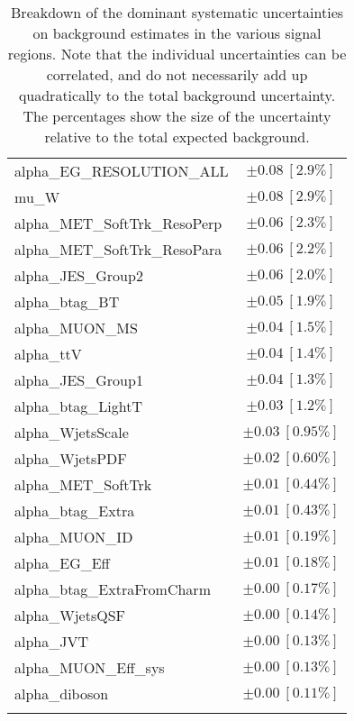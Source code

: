 \begin{table}
\begin{center}
\begin{tabular*}{\textwidth}{@{\extracolsep{\fill}}lc}
alpha\_EG\_RESOLUTION\_ALL         & $\pm 0.08\ [2.9\%] $       \\
mu\_W         & $\pm 0.08\ [2.9\%] $       \\
alpha\_MET\_SoftTrk\_ResoPerp         & $\pm 0.06\ [2.3\%] $       \\
alpha\_MET\_SoftTrk\_ResoPara         & $\pm 0.06\ [2.2\%] $       \\
alpha\_JES\_Group2         & $\pm 0.06\ [2.0\%] $       \\
alpha\_btag\_BT         & $\pm 0.05\ [1.9\%] $       \\
alpha\_MUON\_MS         & $\pm 0.04\ [1.5\%] $       \\
alpha\_ttV         & $\pm 0.04\ [1.4\%] $       \\
alpha\_JES\_Group1         & $\pm 0.04\ [1.3\%] $       \\
alpha\_btag\_LightT         & $\pm 0.03\ [1.2\%] $       \\
alpha\_WjetsScale         & $\pm 0.03\ [0.95\%] $       \\
alpha\_WjetsPDF         & $\pm 0.02\ [0.60\%] $       \\
alpha\_MET\_SoftTrk         & $\pm 0.01\ [0.44\%] $       \\
alpha\_btag\_Extra         & $\pm 0.01\ [0.43\%] $       \\
alpha\_MUON\_ID         & $\pm 0.01\ [0.19\%] $       \\
alpha\_EG\_Eff         & $\pm 0.01\ [0.18\%] $       \\
alpha\_btag\_ExtraFromCharm         & $\pm 0.00\ [0.17\%] $       \\
alpha\_WjetsQSF         & $\pm 0.00\ [0.14\%] $       \\
alpha\_JVT         & $\pm 0.00\ [0.13\%] $       \\
alpha\_MUON\_Eff\_sys         & $\pm 0.00\ [0.13\%] $       \\
alpha\_diboson         & $\pm 0.00\ [0.11\%] $       \\
\noalign{\smallskip}\hline\noalign{\smallskip}
\end{tabular*}
\end{center}
\caption[Breakdown of uncertainty on background estimates]{
Breakdown of the dominant systematic uncertainties on background estimates in the various signal regions.
Note that the individual uncertainties can be correlated, and do not necessarily add up quadratically to 
the total background uncertainty. The percentages show the size of the uncertainty relative to the total expected background.
\label{table.results.bkgestimate.uncertainties.SRMMEM_cuts}}
\end{table}
%